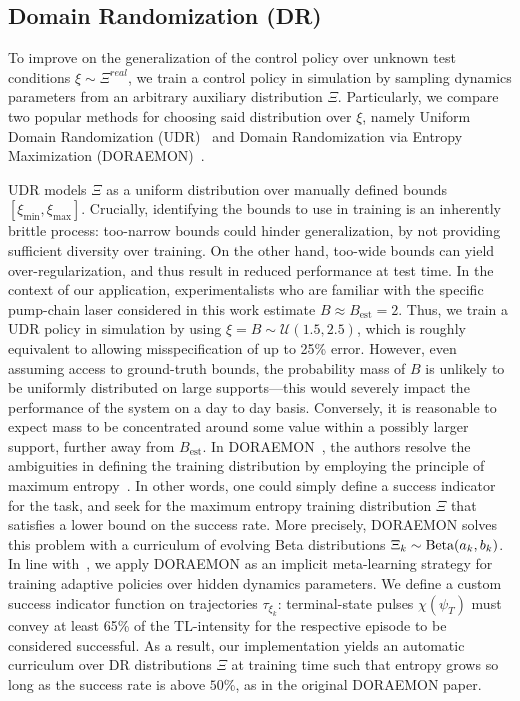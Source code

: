 \subsection{Domain Randomization (DR)}
To improve on the generalization of the control policy over unknown test conditions $\xi \sim \Xi^{real} $, we train a control policy in simulation by sampling dynamics parameters from an arbitrary auxiliary distribution $\Xi$. Particularly, we compare two popular methods for choosing said distribution over $\xi$, namely Uniform Domain Randomization (UDR)~\citep{tobin2017domain, sadeghi2016cad2rl} and Domain Randomization via Entropy Maximization (DORAEMON)~\citep{tiboni2023domain}.

UDR models \( \Xi \) as a uniform distribution over manually defined bounds \( [\xi_{\min}, \xi_{\max}] \).
Crucially, identifying the bounds to use in training is an inherently brittle process: too-narrow bounds could hinder generalization, by not providing sufficient diversity over training. On the other hand, too-wide bounds can yield over-regularization, and thus result in reduced performance at test time. In the context of our application, experimentalists who are familiar with the specific pump-chain laser considered in this work estimate \( B \approx B_{\text{est}} = 2 \). Thus, we train a UDR policy in simulation by using $\xi = B \sim \mathcal U(1.5, 2.5)$, which is roughly equivalent to allowing misspecification of up to 25\% error.
However, even assuming access to ground-truth bounds, the probability mass of \( B \) is unlikely to be uniformly distributed on large supports---this would severely impact the performance of the system on a day to day basis. Conversely, it is reasonable to expect mass to be concentrated around some value within a possibly larger support, further away from \( B_{\text{est}} \).
In DORAEMON~\citep{tiboni2023domain}, the authors resolve the ambiguities in defining the training distribution by employing the principle of maximum entropy~\citep{jaynes1957information}. In other words, one could simply define a success indicator for the task, and seek for the maximum entropy training distribution \( \Xi \) that satisfies a lower bound on the success rate.
%
More precisely, DORAEMON solves this problem with a curriculum of evolving Beta distributions \( \Xi_k \sim \text{Beta}(a_k, b_k) \).
In line with~\citet{tiboni2023domain}, we apply DORAEMON as an implicit meta-learning strategy for training adaptive policies over hidden dynamics parameters. We define a custom success indicator function on trajectories \( \tau_{\xi_k} \): terminal-state pulses \( \chi(\psi_T) \) must convey at least 65\% of the TL-intensity for the respective episode to be considered successful.
As a result, our implementation yields an automatic curriculum over DR distributions \( \Xi \) at training time such that entropy grows so long as the success rate is above \( 50 \)\%, as in the original DORAEMON paper.